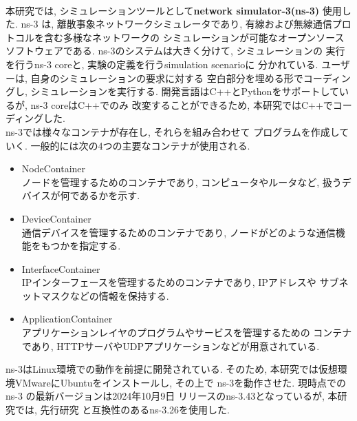 \\[1em]
\indent 本研究では, シミュレーションツールとして\textbf{network simulator-3(ns-3)}
\cite{ns-3}使用した. ns-3 は, 離散事象ネットワークシミュレータであり, 
有線および無線通信プロトコルを含む多様なネットワークの
シミュレーションが可能なオープンソースソフトウェアである. 
ns-3のシステムは大きく分けて, シミュレーションの
実行を行うns-3 coreと, 実験の定義を行うsimulation scenarioに
分かれている. ユーザーは, 自身のシミュレーションの要求に対する
空白部分を埋める形でコーディングし, シミュレーションを実行する. 
開発言語はC++とPythonをサポートしているが, ns-3 coreはC++でのみ
改変することができるため, 本研究ではC++でコーディングした.\\
\indent ns-3では様々なコンテナが存在し, それらを組み合わせて
プログラムを作成していく. 一般的には次の4つの主要なコンテナが使用される.
\begin{itemize}
  \item NodeContainer\\ 
  \indent ノードを管理するためのコンテナであり, 
  コンピュータやルータなど, 扱うデバイスが何であるかを示す. 
  \item DeviceContainer\\
  \indent 通信デバイスを管理するためのコンテナであり, 
  ノードがどのような通信機能をもつかを指定する. 
  \item InterfaceContainer\\
  \indent IPインターフェースを管理するためのコンテナであり, IPアドレスや
  サブネットマスクなどの情報を保持する.
  \item ApplicationContainer\\
  \indent アプリケーションレイヤのプログラムやサービスを管理するための
  コンテナであり, HTTPサーバやUDPアプリケーションなどが用意されている.
\end{itemize}

ns-3はLinux環境での動作を前提に開発されている. そのため, 
本研究では仮想環境VMwareにUbuntuをインストールし, その上で
ns-3を動作させた. 現時点での ns-3 の最新バージョンは2024年10月9日
リリースのns-3.43となっているが, 本研究では, 先行研究
\cite{shinato}と互換性のあるns-3.26を使用した. \\[1em]


 
